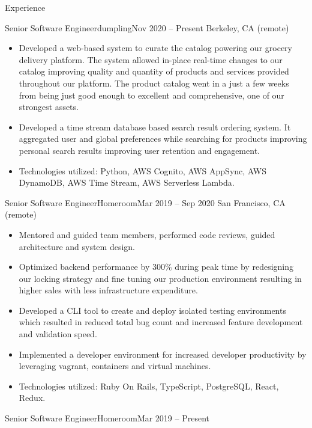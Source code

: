 \documentclass[calibri]{mcdowellcv}
\begin{document}
\makeheader

\begin{cvsection}{Experience}
	\vskip 0.2in
	\begin{cvsubsection}{Senior Software Engineer}{dumpling}{Nov 2020 -- Present}
		Berkeley, CA (remote)
		\begin{itemize}%
			\item Developed a web-based system to curate the catalog powering our grocery delivery platform. The system allowed in-place real-time changes to our catalog improving quality and quantity of products and services provided throughout our platform. The product catalog went in a just a few weeks from being just good enough to excellent and comprehensive, one of our strongest assets.
			\item Developed a time stream database based search result ordering system. It aggregated user and global preferences while searching for products improving personal search results improving user retention and engagement.
			\item Technologies utilized: Python, AWS Cognito, AWS AppSync, AWS DynamoDB, AWS Time Stream, AWS Serverless Lambda.
		\end{itemize}
	\end{cvsubsection}
	\vskip 0.3in
	\begin{cvsubsection}{Senior Software Engineer}{Homeroom}{Mar 2019 -- Sep 2020}
		San Francisco, CA (remote)
		\begin{itemize}%
			\item Mentored and guided team members, performed code reviews, guided architecture and system design.
			\item Optimized backend performance by 300\% during peak time by redesigning our locking strategy and fine tuning our production environment resulting in higher sales with less infrastructure expenditure.
			\item Developed a CLI tool to create and deploy isolated testing environments which resulted in reduced total bug count and increased feature development and validation speed.
			\item Implemented a developer environment for increased developer productivity by leveraging vagrant, containers and virtual machines.
			\item Technologies utilized: Ruby On Rails, TypeScript, PostgreSQL, React, Redux.
		\end{itemize}
	\end{cvsubsection}
	\vskip 0.3in
	\begin{cvsubsection}{Senior Software Engineer}{Homeroom}{Mar 2019 -- Present}

\end{cvsubsection}
\end{cvsection}
\end{document}
